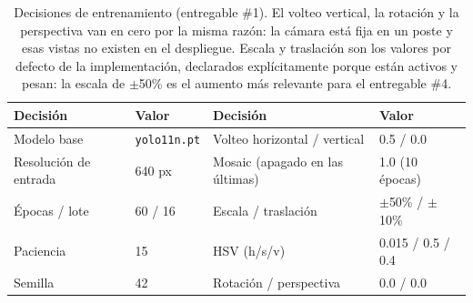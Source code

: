 \begin{table}[t]
  \centering
  \footnotesize
  \begin{tabular}{ll@{\qquad}ll}
    \toprule
    Decisión & Valor & Decisión & Valor \\
    \midrule
    Modelo base & \texttt{yolo11n.pt} & Volteo horizontal / vertical & 0.5 / 0.0 \\
    Resolución de entrada & 640 px & Mosaic (apagado en las últimas) & 1.0 (10 épocas) \\
    Épocas / lote & 60 / 16 & Escala / traslación & $\pm$50\% / $\pm$10\% \\
    Paciencia & 15 & HSV (h/s/v) & 0.015 / 0.5 / 0.4 \\
    Semilla & 42 & Rotación / perspectiva & 0.0 / 0.0 \\
    \bottomrule
  \end{tabular}
  \caption{Decisiones de entrenamiento (entregable \#1). El volteo vertical, la rotación y la perspectiva van en cero por la misma razón: la cámara está fija en un poste y esas vistas no existen en el despliegue. Escala y traslación son los valores por defecto de la implementación, declarados explícitamente porque están activos y pesan: la escala de $\pm$50\% es el aumento más relevante para el entregable \#4.}
  \label{tab:entrenamiento}
\end{table}
